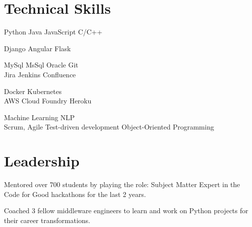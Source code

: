 \documentclass[]{deedy-resume-reversed}
\begin{document}
\begin{minipage}[t]{0.33\textwidth}


\section{Technical Skills}
Python \textbullet{} Java \textbullet{} JavaScript \textbullet{} C/C++ \\
\sectionsep

Django \textbullet{} Angular \textbullet{} Flask \\
\sectionsep

MySql \textbullet{} MsSql \textbullet{} Oracle \textbullet{} Git\\
Jira \textbullet{} Jenkins \textbullet{} Confluence
\sectionsep

Docker \textbullet{} Kubernetes \\
AWS \textbullet{} Cloud Foundry \textbullet{} Heroku \\
\sectionsep

Machine Learning \textbullet{} NLP \\
Scrum, Agile \textbullet{} Test-driven development \textbullet{} Object-Oriented Programming\\
\sectionsep


\section{Leadership}

\begin{tightemize}
\vspace{\topsep} %
\item Mentored over 700 students by playing the role: Subject Matter Expert in the Code for Good hackathons for the last 2 years.
\item Coached 3 fellow middleware engineers to learn and work on Python projects for their career transformations.
\end{tightemize}
\sectionsep


\end{minipage}
\end{document}
